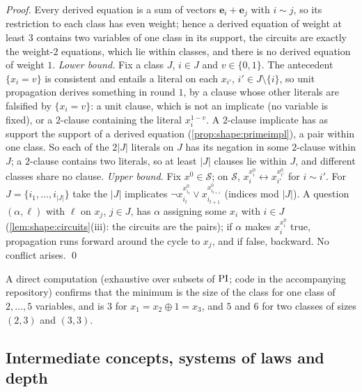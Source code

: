 \begin{remark}
\emph{Proof.} Every derived equation is a sum of vectors $\mathbf e_i+\mathbf e_j$ with $i\sim j$, so its restriction to each class has even weight; hence a derived equation of weight at least $3$ contains two variables of one class in its support, the circuits are exactly the weight-$2$ equations, which lie within classes, and there is no derived equation of weight $1$. \emph{Lower bound.} Fix a class $J$, $i\in J$ and $v\in\{0,1\}$. The antecedent $\{x_i=v\}$ is consistent and entails a literal on each $x_{i'}$, $i'\in J\setminus\{i\}$, so unit propagation derives something in round $1$, by a clause whose other literals are falsified by $\{x_i=v\}$: a unit clause, which is not an implicate (no variable is fixed), or a $2$-clause containing the literal $x_i^{1-v}$. A $2$-clause implicate has as support the support of a derived equation (\cref{prop:shape:primeimpl}), a pair within one class. So each of the $2\lvert J\rvert$ literals on $J$ has its negation in some $2$-clause within $J$; a $2$-clause contains two literals, so at least $\lvert J\rvert$ clauses lie within $J$, and different classes share no clause. \emph{Upper bound.} Fix $x^0\in\mathcal S$; on $\mathcal S$, $x_i^{x^0_i}\leftrightarrow x_{i'}^{x^0_{i'}}$ for $i\sim i'$. For $J=\{i_1,\dots,i_{\lvert J\rvert}\}$ take the $\lvert J\rvert$ implicates $\neg x_{i_t}^{x^0_{i_t}}\vee x_{i_{t+1}}^{x^0_{i_{t+1}}}$ (indices mod $\lvert J\rvert$). A question $(\alpha,\ell)$ with $\ell$ on $x_j$, $j\in J$, has $\alpha$ assigning some $x_i$ with $i\in J$ (\cref{lem:shape:circuits}(iii): the circuits are the pairs); if $\alpha$ makes $x_i^{x^0_i}$ true, propagation runs forward around the cycle to $x_j$, and if false, backward. No conflict arises. \qed

A direct computation (exhaustive over subsets of $\mathrm{PI}$; code in the accompanying repository) confirms that the minimum is the size of the class for one class of $2,\dots,5$ variables, and is $3$ for $x_1=x_2\oplus1=x_3$, and $5$ and $6$ for two classes of sizes $(2,3)$ and $(3,3)$.
\end{remark}

\subsection{Intermediate concepts, systems of laws and depth}\label{app:shape:aux}

